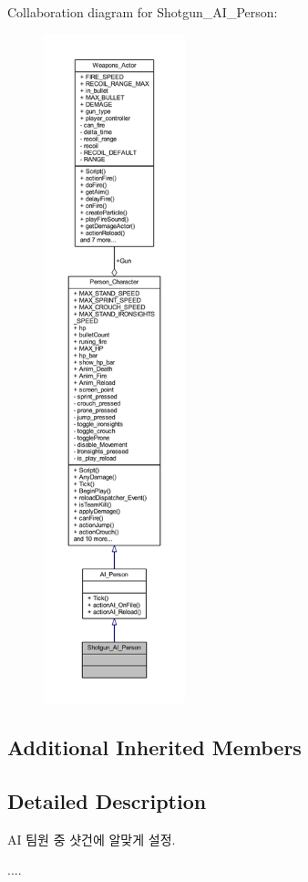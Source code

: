Collaboration diagram for Shotgun\+\_\+\+A\+I\+\_\+\+Person\+:
\nopagebreak
\begin{figure}[H]
\begin{center}
\leavevmode
\includegraphics[height=550pt]{class_shotgun___a_i___person__coll__graph}
\end{center}
\end{figure}
\subsection*{Additional Inherited Members}


\subsection{Detailed Description}
AI 팀원 중 샷건에 알맞게 설정. 

.... 